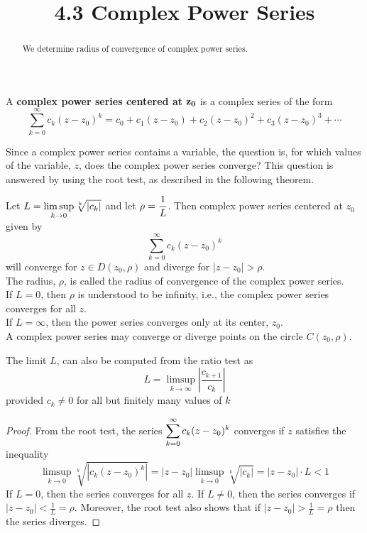 \documentclass[handout]{ximera}
\title{4.3 Complex Power Series}
\begin{document}
\begin{abstract}
We determine radius of convergence of complex power series.
\end{abstract}

\maketitle


\begin{definition} 
A {\bf complex power series centered at} ${\bf z_0}$ is a complex series of the form
\[
\sum_{k=0}^\infty c_k(z-z_0)^k = c_0 + c_1 (z-z_0) + c_2 (z-z_0)^2 + c_3 (z-z_0)^3 + \cdots
\]
\end{definition}
Since a complex power series contains a variable, the question is, for which values of the variable, $z$, 
does the complex power series converge? This question is answered by using the root test, as described in the following theorem.

\begin{theorem}
Let $\displaystyle L = \limsup_{k \to 0} \sqrt[k]{|c_k|}$ and let $\displaystyle \rho = \frac{1}{L}$.
Then complex power series centered at $z_0$ given by
\[
\sum_{k=0}^\infty c_k(z-z_0)^k
\]
will converge for 
$z \in D(z_0, \rho)$ and diverge for $|z-z_0| > \rho$.\\
The radius, $\rho$, is called the radius of convergence of the complex power series.\\
If $L = 0$, then $\rho$ is understood to be infinity, i.e., the complex power series converges for all $z$.\\
If $L = \infty$, then the power series converges only at its center, $z_0$.\\
A complex power series may converge or diverge points on the circle $C(z_0, \rho)$.
\end{theorem}
\begin{remark}
The limit $L$, can also be computed from the ratio test as 
\[
L = \limsup_{k \to \infty} \left|\frac{c_{k+1}}{c_k}\right|
\]
provided $c_k \neq 0$ for all but finitely many values of $k$
\end{remark}


\begin{proof}
From the root test, the series  $\displaystyle \sum_{k=0}^\infty c_k(z-z_0)^k$ converges if $z$ satisfies the inequality
\[
\limsup_{k \to 0} \sqrt[k]{|c_k(z-z_0)^k|} = |z-z_0| \limsup_{k \to 0} \sqrt[k]{|c_k|} = |z-z_0| \cdot L < 1
\]
If $L =0$, then the series converges for all $z$. If $L \neq 0$, then the series converges if $|z-z_0| < \frac{1}{L} = \rho$.
Moreover, the root test also shows that if $|z-z_0|  > \frac{1}{L} = \rho$ then the series diverges.
\end{proof}
\end{document}
